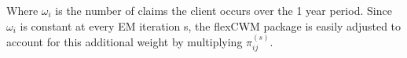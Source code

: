 \documentclass[11pt,letterpaper]{article}
\numberwithin{equation}{section}
\numberwithin{equation}{section}
\numberwithin{equation}{section}
\begin{document}
Where $\mathcal{\omega}_i$ is the number of claims the client occurs over the 1 year period. Since $\mathcal{\omega}_i$ is constant at every EM iteration s, the flexCWM package is easily adjusted to account for this additional weight by multiplying  $\pi^{(s)}_{ij}$. 

\end{document}

